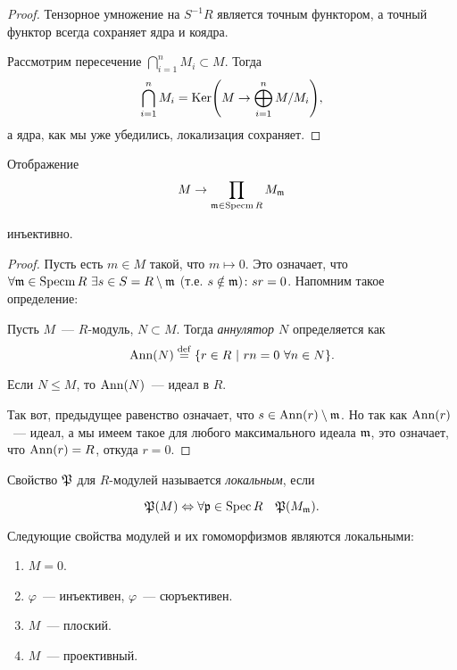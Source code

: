 	\begin{proof}
		Тензорное умножение на $S^{-1}R$ является точным функтором, а точный функтор всегда сохраняет ядра и коядра. 

		Рассмотрим пересечение $\bigcap_{i = 1}^{n} M_i \subset M$. Тогда 
		\[
			\bigcap_{i = 1}^{n} M_i = \Ker\lr*{M \to \bigoplus_{i = 1}^{n} M/M_i}, 
		\]
		а ядра, как мы уже убедились, локализация сохраняет. 
	\end{proof}

	\begin{lemma} 
		Отображение 
		\[
			M \to \prod_{\mathfrak{m} \in \operatorname{Specm}{R}} M_{\mathfrak{m}}
		\]

		инъективно. 
	\end{lemma}

	\begin{proof}
		 Пусть есть $m \in M$ такой, что $m \mapsto 0$. Это означает, что $\forall \fm \in \Specm{R} \ \exists s \in S = R \setminus \fm$ (т.е. $s \notin \mathfrak{m})\colon sr = 0$. Напомним такое определение: 

		 \begin{definition} 
		 	Пусть $M$~--- $R$-модуль, $N \subset M$. Тогда \emph{аннулятор $N$} определяется как 
		 	\[
		 		\operatorname{Ann}(N) \stackrel{\mathrm{def}}{=} \{ r \in R \ \vert \ rn = 0  \ \forall n \in N \}.
		 	\]
		 \end{definition}

		 \begin{remark}
		 	Если $N \le M$, то $\operatorname{Ann}(N)$~--- идеал в $R$.
		 \end{remark}

		 Так вот, предыдущее равенство означает, что $s \in \operatorname{Ann}(r) \setminus \mathfrak{m}$. Но так как $\operatorname{Ann}(r)$~--- идеал, а мы имеем такое для любого максимального идеала $\mathfrak{m}$, это означает, что $\operatorname{Ann}(r) = R$, откуда $r = 0$.
	\end{proof}

	Свойство $\mathfrak{P}$ для $R$-модулей называется \emph{локальным}, если 

	\[
		\mathfrak{P}(M) \Leftrightarrow \forall \mathfrak{p} \in \operatorname{Spec}{R} \quad \mathfrak{P}(M_{\mathfrak{m}}).
	\]

	\begin{theorem} 
		Следующие свойства модулей и их гомоморфизмов являются локальными: 

		\begin{enumerate}
			\item $M = 0$.

			\item $\varphi$~--- инъективен, $\varphi$~--- сюръективен. 

			\item $M$~--- плоский. 

			\item $M$~--- проективный. 
		\end{enumerate}
	\end{theorem}

